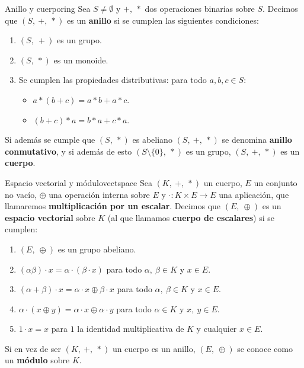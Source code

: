 \documentclass[a4paper]{book}
\theoremstyle{definition}
\theoremstyle{ejemplo}
\theoremstyle{demostracion}
\begin{document}
\begin{define}{Anillo y cuerpo}{ring}
	Sea $S \neq \emptyset$ y $+,\ *$ dos operaciones binarias sobre $S$. Decimos que $(S,\ +,\ *)$ es un \textbf{anillo} si se cumplen las siguientes condiciones:
	\begin{enumerate}
		\item
		$(S,\ +)$ es un grupo.
		
		\item
		$(S,\ *)$ es un monoide.
		
		\item
		Se cumplen las propiedades distributivas: para todo $a,b,c \in S$:
		\begin{itemize}
			\item
			$a*(b + c) = a*b + a*c$.
			\item
			$(b + c)*a = b*a + c*a$.
		\end{itemize}
	\end{enumerate}
	Si además se cumple que $(S,\ *)$ es abeliano $(S,\ +,\ *)$ se denomina \textbf{anillo conmutativo}, y si además de esto $(S\setminus \{0\},\ *)$ es un grupo, $(S,\ +,\ *)$ es un \textbf{cuerpo}.
\end{define}

\begin{define}{Espacio vectorial y módulo}{vectspace}
	Sea $(K,\ +,\ *)$ un cuerpo, $E$ un conjunto no vacío, $\oplus$ una operación interna sobre $E$ y $\cdot : K \times E \rightarrow E$ una aplicación, que llamaremos \textbf{multiplicación por un escalar}. Decimos que $(E,\ \oplus)$ es un \textbf{espacio vectorial} sobre $K$ (al que llamamos \textbf{cuerpo de escalares}) si se cumplen:
	\begin{enumerate}
		\item
		$(E,\ \oplus)$ es un grupo abeliano.
		
		\item
		$(\alpha \beta)\cdot x = \alpha\cdot ( \beta\cdot  x)$ para todo $\alpha,\ \beta \in K$ y $x \in E$.
		
		\item
		$(\alpha + \beta)\cdot x = \alpha\cdot  x \oplus \beta\cdot  x$ para todo $\alpha,\ \beta \in K$ y $x \in E$.
		
		\item
		$\alpha\cdot  (x \oplus y) = \alpha\cdot  x \oplus \alpha\cdot  y$ para todo $\alpha \in K$ y $x,\ y \in E$.
		
		\item
		$1\cdot x = x$ para $1$ la identidad multiplicativa de $K$ y cualquier $x \in E$.
	\end{enumerate}
	Si en vez de ser $(K,\ +,\ *)$ un cuerpo es un anillo, $(E,\ \oplus)$ se conoce como un \textbf{módulo} sobre $K$.
\end{define}
\end{document}
